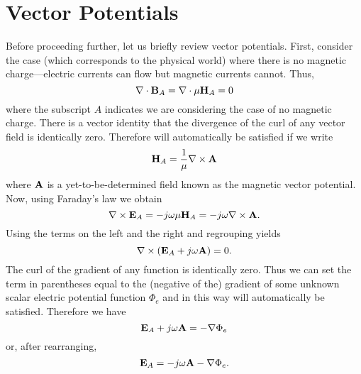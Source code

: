 \section{Vector Potentials}

Before proceeding further, let us briefly review vector potentials.
First, consider the case (which corresponds to the physical world) where
there is no magnetic charge---electric currents can flow but magnetic
currents cannot.  Thus, 
\begin{equation}
  \nabla\cdot \mathbf{B}_A = \nabla\cdot \mu \mathbf{H}_A = 0 \label{eq:divBA}
\end{equation}
where the subscript $A$ indicates we are considering the case of no
magnetic charge.  There is a vector identity that the divergence of
the curl of any vector field is identically zero.  Therefore
 will automatically be satisfied if we write
\begin{equation}
  \mathbf{H}_A = \frac{1}{\mu}\nabla\times\mathbf{A}
\end{equation}
where $\mathbf{A}$ is a yet-to-be-determined field known as the magnetic
vector potential.  Now, using Faraday's law we obtain
\begin{equation}
\nabla\times\mathbf{E}_A = -j\omega\mu\mathbf{H}_A = -j\omega\nabla\times\mathbf{A}.
\end{equation}
Using the terms on the left and the right and regrouping yields
\begin{equation}
  \nabla\times(\mathbf{E}_A + j\omega\mathbf{A}) = 0.
  \label{eq:derivingAI}
\end{equation}
The curl of the gradient of any function is identically zero.  Thus we
can set the term in parentheses equal to the (negative of the)
gradient of some unknown scalar electric potential function $\Phi_e$
and in this way  will automatically be satisfied.
Therefore we have
\begin{equation}
  \mathbf{E}_A + j\omega\mathbf{A} = -\nabla\Phi_e
\end{equation}
or, after rearranging, 
\begin{equation}
  \mathbf{E}_A = -j\omega\mathbf{A} -\nabla\Phi_e.
\end{equation}

